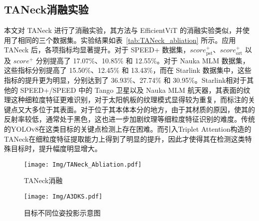 \subsection{TANeck消融实验}

本文对 TANeck 进行了消融实验，其方法与 EfficientViT 的消融实验类似，并使用了相同的三个数据集。实验结果如表~\ref{tab:TANeck_abliation} 所示。应用 TANeck 后，各项指标均显著提升。对于 SPEED+ 数据集，$score_{\text{pst}}^+$、$score_{\text{ort}}^+$ 以及 $score^+$ 分别提高了 17.07\%、10.85\% 和 12.55\%。对于 Nauka MLM 数据集，这些指标分别提高了 15.50\%、12.45\% 和 13.43\%，而在 Starlink 数据集中，这些指标的提升更为明显，分别达到了 36.93\%、27.74\% 和 30.95\%。Starlink相对于其他的 SPEED+/SPEED 中的 Tango 卫星以及 Nauka MLM 航天器，其表面的纹理这种细粒度特征更难识别，对于太阳帆板的纹理模式显得较为重复，而标注的关键点又大多位于其表面。对于位于其本体本分的地方，由于其材质的原因，使其的反射率较低，通常处于黑色，这也进一步加剧纹理等细粒度特征识别的难度。传统的YOLOv8在这类目标的关键点检测上存在困难。而引入Triplet Attention构造的TANeck在细粒度特征提取能力上得到了明显的提升，因此才使得其在检测这类特殊目标时，提升幅度明显增大。


\begin{table}[!htbp]
	\centering
	\caption{TANeck 消融实验}
	\label{tab:TANeck_abliation}
	{%
	}
\end{table}

\begin{figure}[htbp]
	\centering
	\texttt{[image: Img/TANeck\_Abliation.pdf]}
	\caption{TANeck消融}
	\label{fig:TANeck_abliation}
	\vspace{-3ex}
\end{figure}
\begin{figure}[htbp]
	\centering
	\texttt{[image: Img/A3DKS.pdf]}
	\caption{目标不同位姿投影示意图}
	\label{fig:projection_area_compare}
	\vspace{-3ex}
\end{figure}

